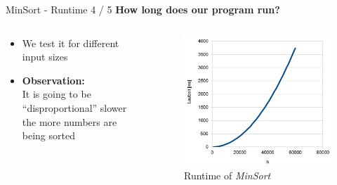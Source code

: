 \begin{frame}{MinSort - Runtime 4 / 5}
  \textbf{How long does our program run?}\vspace*{-0.5em}
  \begin{columns}
    \begin{column}{0.415\textwidth}
      \begin{itemize}
        \item
          We test it for different input sizes
        \item
        \textbf{Observation:}\\
        It is going to be \enquote{disproportional}
        slower the more numbers are being sorted
      \end{itemize}
    \end{column}
    \begin{column}{0.585\textwidth}
      \begin{center}%
        \begin{figure}%
          \includegraphics[width=\textwidth]{Lecture/Images/RuntimeSquared.png}%
          \vspace*{-1.0em}\caption{Runtime of \textit{MinSort}}%
          \label{fig:minsort_runtime}%
        \end{figure}%
      \end{center}
    \end{column}
  \end{columns}
\end{frame}

